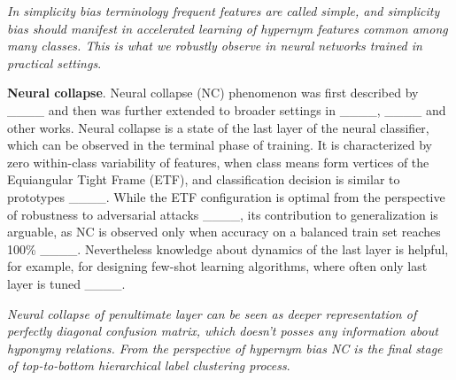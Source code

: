 \textit{In simplicity bias terminology frequent features are called simple, and
  simplicity bias should manifest in accelerated learning of hypernym features
  common among many classes. This is what we robustly observe in neural networks
  trained in practical settings}.


\textbf{Neural collapse}. Neural collapse (NC) phenomenon was first described
by ____ and then was further extended to broader settings
in ____, ____ and other works. Neural
collapse is a state of the last layer of the neural classifier, which can be
observed in the terminal phase of training. It is characterized by zero
within-class variability of features, when class means form vertices of the
Equiangular Tight Frame (ETF), and classification decision is similar to
prototypes ____. While the ETF configuration is optimal
from the perspective of robustness to adversarial attacks
____, its contribution to generalization is arguable, as
NC is observed only when accuracy on a balanced train set reaches 100\%
____. Nevertheless knowledge about dynamics of the last
layer is helpful, for example, for designing few-shot learning algorithms, where
often only last layer is tuned ____.

\textit{Neural collapse of penultimate layer can be seen as deeper
  representation of perfectly diagonal confusion matrix, which doesn't posses
  any information about hyponymy relations. From the perspective of hypernym
  bias NC is the final stage of top-to-bottom hierarchical label clustering
  process}.